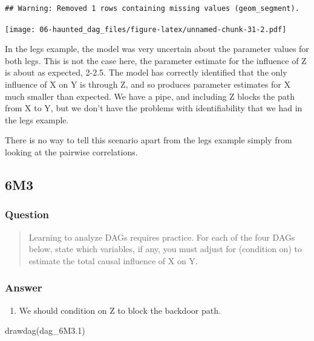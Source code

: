 \documentclass[
]{book}
\newenvironment{Shaded}{\begin{snugshade}}{\end{snugshade}}
\newcommand{\FloatTok}[1]{\textcolor[rgb]{0.00,0.00,0.81}{#1}}
\newcommand{\FunctionTok}[1]{\textcolor[rgb]{0.00,0.00,0.00}{#1}}
\newcommand{\NormalTok}[1]{#1}
\providecommand{\tightlist}{%
  \setlength{\itemsep}{0pt}\setlength{\parskip}{0pt}}
\begin{document}
\begin{verbatim}
## Warning: Removed 1 rows containing missing values (geom_segment).
\end{verbatim}

\texttt{[image: 06-haunted\_dag\_files/figure-latex/unnamed-chunk-31-2.pdf]}

In the legs example, the model was very uncertain about the parameter values for both legs. This is not the case here, the parameter estimate for the influence of Z is about as expected, 2-2.5. The model has correctly identified that the only influence of X on Y is through Z, and so produces parameter estimates for X much smaller than expected. We have a pipe, and including Z blocks the path from X to Y, but we don't have the problems with identifiability that we had in the legs example.

There is no way to tell this scenario apart from the legs example simply from looking at the pairwise correlations.

\hypertarget{m3-3}{%
\subsection*{6M3}\label{m3-3}}

\hypertarget{question-54}{%
\subsubsection*{Question}\label{question-54}}

\begin{quote}
Learning to analyze DAGs requires practice. For each of the four DAGs below, state which variables, if any, you must adjust for (condition on) to estimate the total causal influence of X on Y.
\end{quote}

\hypertarget{answer-54}{%
\subsubsection*{Answer}\label{answer-54}}

\begin{enumerate}
\def\labelenumi{\arabic{enumi}.}
\tightlist
\item
  We should condition on Z to block the backdoor path.
\end{enumerate}

\begin{Shaded}
\begin{Highlighting}[]
\FunctionTok{drawdag}\NormalTok{(dag\_6M3}\FloatTok{.1}\NormalTok{)}
\end{Highlighting}
\end{Shaded}
\end{document}
